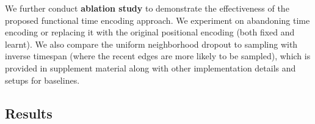 \documentclass{article} %
\begin{document}
We further conduct \textbf{ablation study} to demonstrate the effectiveness of the proposed functional time encoding approach. We experiment on abandoning time encoding or replacing it with the original positional encoding (both fixed and learnt). We also compare the uniform neighborhood dropout to sampling with inverse timespan (where the recent edges are more likely to be sampled), which is provided in supplement material along with other implementation details and setups for baselines.

\subsection{Results}
\label{sec:results}
\end{document}
